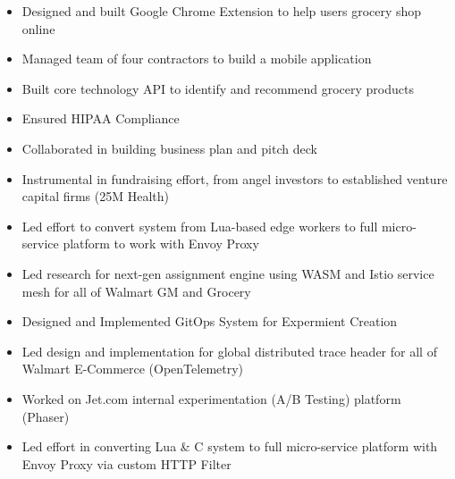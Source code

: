 \documentclass[10pt,a4paper,ragged2e,withhyper]{altacv}
\begin{document}
\begin{paracol}{2}
  
  \begin{itemize}
    \item Designed and built Google Chrome Extension to help users grocery shop online
    \item Managed team of four contractors to build a mobile application
    \item Built core technology API to identify and recommend grocery products
    \item Ensured HIPAA Compliance
    \item Collaborated in building business plan and pitch deck
    \item Instrumental in fundraising effort, from angel investors to established venture capital firms (25M Health)
  \end{itemize}
  
  \divider
  
  \begin{itemize}
    \item Led effort to convert system from Lua-based edge workers to full micro-service platform to work with Envoy Proxy
    \item Led research for next-gen assignment engine using WASM and Istio service mesh for all of Walmart GM and Grocery
    \item Designed and Implemented GitOps System for Expermient Creation
    \item Led design and implementation for global distributed trace header for all of Walmart E-Commerce (OpenTelemetry)
  \end{itemize}
  
  \divider
  
  \begin{itemize}
    \item Worked on Jet.com internal experimentation (A/B Testing) platform (Phaser)
    \item Led effort in converting Lua \& C system to full micro-service platform with Envoy Proxy via custom HTTP Filter
  \end{itemize}
  

\end{paracol}
\end{document}
